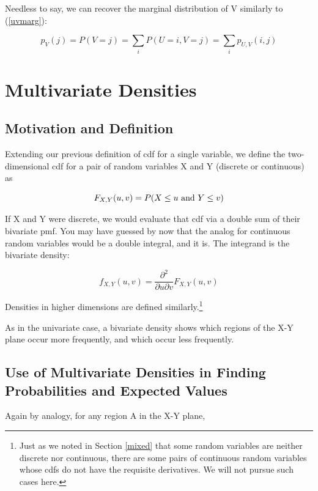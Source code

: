 Needless to say, we can recover the marginal distribution of V similarly
to (\ref{uvmarg}):

\begin{equation}
p_V(j) = P(V = j) = \sum_{i} P(U = i, V = j) =
\sum_{i} p_{U,V}(i,j)
\end{equation}

\section{Multivariate Densities}

\subsection{Motivation and Definition}

Extending our previous definition of cdf for a single variable, we
define the two-dimensional cdf for a pair of random variables X and Y
(discrete or continuous) as

\begin{equation}
F_{X,Y}(u,v) = P(X \leq u {\rm ~and~ } Y \leq v)
\end{equation}

If X and Y were discrete, we would evaluate that cdf via a double sum of
their bivariate pmf.  You may have guessed by now that the analog for
continuous random variables would be a double integral, and it is.  The
integrand is the bivariate density:

\begin{equation}
f_{X,Y} (u,v) = \frac{\partial^2}{\partial u \partial v}
F_{X,Y}(u,v)
\end{equation}

Densities in higher dimensions are defined similarly.\footnote{Just as
we noted in Section \ref{mixed} that some random variables are neither
discrete nor continuous, there are some pairs of continuous random
variables whose cdfs do not have the requisite derivatives.  We will not
pursue such cases here.}

As in the univariate case, a bivariate density shows which regions of
the X-Y plane occur more frequently, and which occur less frequently.

\subsection{Use of Multivariate Densities in Finding Probabilities
and Expected Values}

Again by analogy, for any region A in the X-Y plane,

